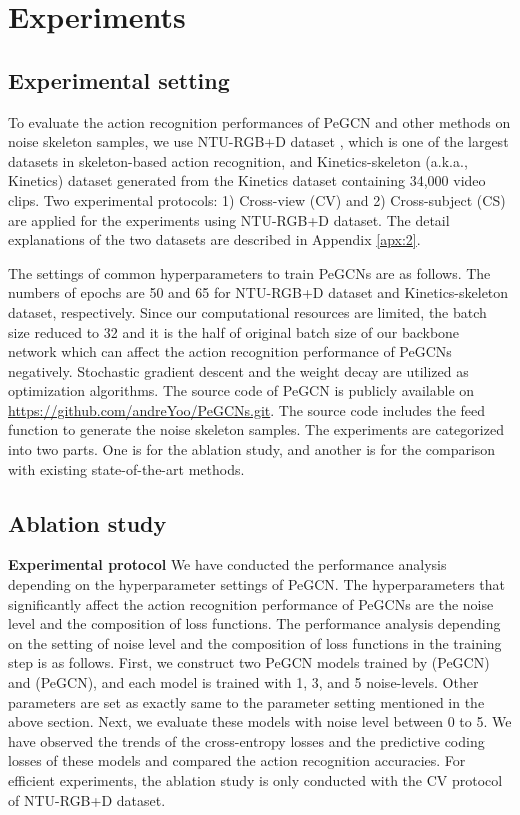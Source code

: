 \documentclass[runningheads]{llncs}
\begin{document}
\section{Experiments}
\label{sec:4}
\subsection{Experimental setting}
To evaluate the action recognition performances of PeGCN and other methods on noise skeleton samples, we use NTU-RGB+D dataset \cite{shahroudy2016ntu}, which is one of the largest datasets in skeleton-based action recognition, and Kinetics-skeleton (a.k.a., Kinetics) dataset generated from the Kinetics dataset \cite{kay2017kinetics} containing 34,000 video clips. Two experimental protocols: 1) Cross-view (CV) and 2) Cross-subject (CS) are applied for the experiments using NTU-RGB+D dataset. The detail explanations of the two datasets are described in Appendix \ref{apx:2}.

The settings of common hyperparameters to train PeGCNs are as follows. The numbers of epochs are 50 and 65 for NTU-RGB+D dataset and Kinetics-skeleton dataset, respectively. Since our computational resources are limited, the batch size reduced to 32 and it is the half of original batch size of our backbone network \cite{shi2019two} which can affect the action recognition performance of PeGCNs negatively. Stochastic gradient descent and the weight decay are utilized as optimization algorithms. The source code of PeGCN is publicly available on \url{https://github.com/andreYoo/PeGCNs.git}. The source code includes the feed function to generate the noise skeleton samples. The experiments are categorized into two parts. One is for the ablation study, and another is for the comparison with existing state-of-the-art methods.

\subsection{Ablation study}
\textbf{Experimental protocol} We have conducted the performance analysis depending on the hyperparameter settings of PeGCN. The hyperparameters that significantly affect the action recognition performance of PeGCNs are the noise level and the composition of loss functions. The performance analysis depending on the setting of noise level and the composition of loss functions in the training step is as follows. First, we construct two PeGCN models trained by  (PeGCN) and  (PeGCN), and each model is trained with 1, 3, and 5 noise-levels. Other parameters are set as exactly same to the parameter setting mentioned in the above section. Next, we evaluate these models with noise level between 0 to 5. We have observed the trends of the cross-entropy losses and the predictive coding losses of these models and compared the action recognition accuracies. For efficient experiments, the ablation study is only conducted with the CV protocol of NTU-RGB+D dataset. 
\end{document}
